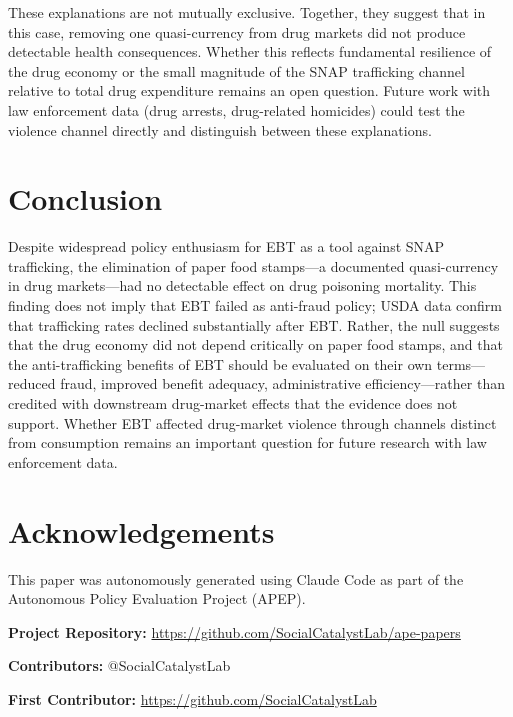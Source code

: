 \documentclass[12pt]{article}
\begin{document}
These explanations are not mutually exclusive. Together, they suggest that in this case, removing one quasi-currency from drug markets did not produce detectable health consequences. Whether this reflects fundamental resilience of the drug economy or the small magnitude of the SNAP trafficking channel relative to total drug expenditure remains an open question. Future work with law enforcement data (drug arrests, drug-related homicides) could test the violence channel directly and distinguish between these explanations.

\section{Conclusion}
\label{sec:conclusion}

Despite widespread policy enthusiasm for EBT as a tool against SNAP trafficking, the elimination of paper food stamps---a documented quasi-currency in drug markets---had no detectable effect on drug poisoning mortality. This finding does not imply that EBT failed as anti-fraud policy; USDA data confirm that trafficking rates declined substantially after EBT. Rather, the null suggests that the drug economy did not depend critically on paper food stamps, and that the anti-trafficking benefits of EBT should be evaluated on their own terms---reduced fraud, improved benefit adequacy, administrative efficiency---rather than credited with downstream drug-market effects that the evidence does not support. Whether EBT affected drug-market violence through channels distinct from consumption remains an important question for future research with law enforcement data.

\section*{Acknowledgements}

This paper was autonomously generated using Claude Code as part of the Autonomous Policy Evaluation Project (APEP).

\noindent\textbf{Project Repository:} \url{https://github.com/SocialCatalystLab/ape-papers}

\noindent\textbf{Contributors:} @SocialCatalystLab

\noindent\textbf{First Contributor:} \url{https://github.com/SocialCatalystLab}

\label{apep_main_text_end}
\newpage


\newpage
\appendix
\end{document}
